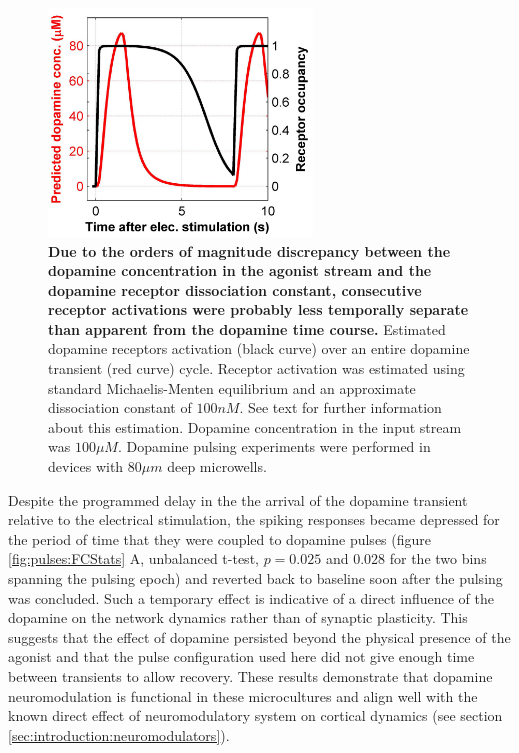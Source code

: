   \begin{figure}[h]
       \centering
       \includegraphics[width=7cm]{chapter6/figures/receptorSat/dopaminePulsingReceptorSat.jpg}

        \caption[Estimated dopamine receptor occupancy levels during a dopamine transient]{\textbf{Due to the orders of magnitude discrepancy between the dopamine concentration in the agonist stream and the dopamine receptor dissociation constant, consecutive receptor activations were probably less temporally separate than apparent from the dopamine time course.} Estimated dopamine receptors activation (black curve) over an entire dopamine transient (red curve) cycle. Receptor activation was estimated using standard Michaelis-Menten equilibrium and an approximate dissociation constant of \(100nM\). See text for further information about this estimation. Dopamine concentration in the input stream was \(100\mu M\). Dopamine pulsing experiments were performed in devices with \(80\mu m\) deep microwells.}

       \label{fig:pulses:receptorSat}

  \end{figure}

  Despite the programmed delay in the the arrival of the dopamine transient relative to the electrical stimulation, the spiking responses became depressed for the period of time that they were coupled to dopamine pulses (figure \ref{fig:pulses:FCStats} A, unbalanced t-test, \(p=0.025\) and \(0.028\) for the two bins spanning the pulsing epoch) and reverted back to baseline soon after the pulsing was concluded. Such a temporary effect is indicative of a direct influence of the dopamine on the network dynamics rather than of synaptic plasticity. This suggests that the effect of dopamine persisted beyond the physical presence of the agonist and that the pulse configuration used here did not give enough time between transients to allow recovery. These results demonstrate that dopamine neuromodulation is functional in these microcultures and align well with the known direct effect of neuromodulatory system on cortical dynamics (see section \ref{sec:introduction:neuromodulators}). 

